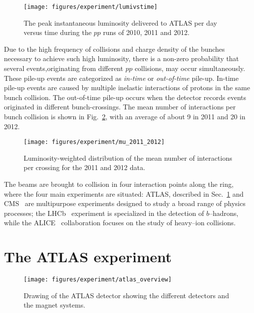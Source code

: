 \begin{figure}[ht]\centering
\texttt{[image: figures/experiment/lumivstime]}
\caption{
The peak instantaneous luminosity delivered to ATLAS per day versus
time during the $pp$ runs of 2010, 2011 and 2012.}
\label{fig:lumivstime}
\end{figure}

Due to the high frequency of collisions and charge density of the
bunches necessary to achieve such high luminosity, there is a non-zero
probability that several events,originating from different $pp$ collisions, 
may occur simultaneously.
These pile-up events are categorized as {\it in-time} or {\it
  out-of-time} pile-up. 
In-time pile-up events are caused by  multiple inelastic interactions
of protons in the same bunch collision.
The out-of-time pile-up occurs when the detector records events
originated in different bunch-crossings.
The mean number of interactions per bunch collision is shown in
Fig.~\ref{fig:mu}, with an average of about 9 in 2011 and 20 in 2012.

\begin{figure}[ht]\centering
\texttt{[image: figures/experiment/mu\_2011\_2012]}
\caption{
Luminosity-weighted distribution of the mean number of interactions
per crossing for the 2011 and 2012 data.}
\label{fig:mu}
\end{figure}

The beams are brought to collision in four interaction points along
the ring, where the four main experiments are situated: 
ATLAS, described in Sec.~\ref{sec:ATLAS} and CMS~\cite{cms} are
multipurpose experiments designed to study a broad range of physics
processes; the LHCb~\cite{lhcb} experiment is specialized in the
detection of $b$--hadrons, while the ALICE~\cite{alice} collaboration
focuses on the study of heavy--ion collisions.

\section{The ATLAS experiment}
\label{sec:ATLAS}

\begin{figure}[ht]
\begin{center}
\texttt{[image: figures/experiment/atlas\_overview]}
\caption[Drawing of the ATLAS detector]{
  Drawing of the ATLAS detector showing the different detectors and
  the magnet systems.}
\label{fig:ATLAS}
\end{center}
\end{figure}

